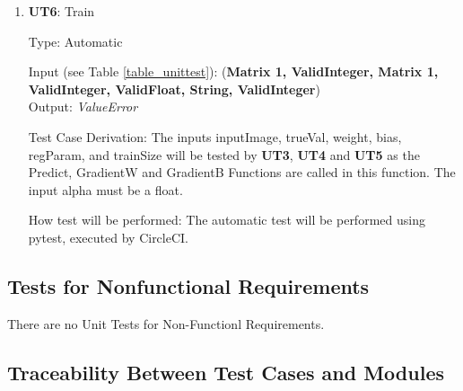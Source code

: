 \documentclass[12pt, titlepage]{article}
\begin{document}
\begin{enumerate}

  \item{\textbf{UT6}: Train}

  Type: Automatic
            
  Input (see Table \ref{table_unittest}): (\textbf{Matrix 1, ValidInteger, Matrix 1, ValidInteger, ValidFloat, String, ValidInteger})\\
            
  Output: \textit{ValueError}
  
  Test Case Derivation: The inputs inputImage, trueVal, weight, bias, regParam, and trainSize will be tested by \textbf{UT3}, \textbf{UT4} and \textbf{UT5} as the Predict, GradientW and GradientB Functions are called in this function. 
  The input alpha must be a float.
  
  How test will be performed: The automatic test will be performed using pytest, executed by CircleCI.

\end{enumerate}

\subsection{Tests for Nonfunctional Requirements}

There are no Unit Tests for Non-Functionl Requirements.

\subsection{Traceability Between Test Cases and Modules}
\end{document}

